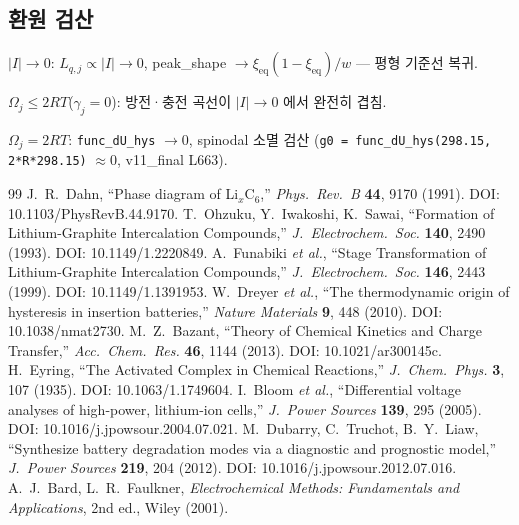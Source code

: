 \documentclass[11pt,a4paper]{article}
\newcommand{\eq}{\mathrm{eq}}
\begin{document}
\subsection{환원 검산}

$|I|\to0$: $L_{q,j}\propto|I|\to0$, peak\_shape $\to\xi_\eq(1-\xi_\eq)/w$ — 평형 기준선 복귀.

$\Omega_j\le2RT$($\gamma_j=0$): 방전·충전 곡선이 $|I|\to0$ 에서 완전히 겹침.

$\Omega_j=2RT$: \texttt{func\_dU\_hys} $\to0$, spinodal 소멸 검산
(\texttt{g0 = func\_dU\_hys(298.15, 2*R*298.15)} $\approx0$, v11\_final L663).

\begin{thebibliography}{99}
 J.\ R.\ Dahn, ``Phase diagram of Li$_x$C$_6$,''
  \emph{Phys.\ Rev.\ B} \textbf{44}, 9170 (1991). DOI: 10.1103/PhysRevB.44.9170.
 T.\ Ohzuku, Y.\ Iwakoshi, K.\ Sawai,
  ``Formation of Lithium-Graphite Intercalation Compounds,''
  \emph{J.\ Electrochem.\ Soc.} \textbf{140}, 2490 (1993). DOI: 10.1149/1.2220849.
 A.\ Funabiki \textit{et al.},
  ``Stage Transformation of Lithium-Graphite Intercalation Compounds,''
  \emph{J.\ Electrochem.\ Soc.} \textbf{146}, 2443 (1999). DOI: 10.1149/1.1391953.
 W.\ Dreyer \textit{et al.},
  ``The thermodynamic origin of hysteresis in insertion batteries,''
  \emph{Nature Materials} \textbf{9}, 448 (2010). DOI: 10.1038/nmat2730.
 M.\ Z.\ Bazant,
  ``Theory of Chemical Kinetics and Charge Transfer,''
  \emph{Acc.\ Chem.\ Res.} \textbf{46}, 1144 (2013). DOI: 10.1021/ar300145c.
 H.\ Eyring,
  ``The Activated Complex in Chemical Reactions,''
  \emph{J.\ Chem.\ Phys.} \textbf{3}, 107 (1935). DOI: 10.1063/1.1749604.
 I.\ Bloom \textit{et al.},
  ``Differential voltage analyses of high-power, lithium-ion cells,''
  \emph{J.\ Power Sources} \textbf{139}, 295 (2005). DOI: 10.1016/j.jpowsour.2004.07.021.
 M.\ Dubarry, C.\ Truchot, B.\ Y.\ Liaw,
  ``Synthesize battery degradation modes via a diagnostic and prognostic model,''
  \emph{J.\ Power Sources} \textbf{219}, 204 (2012). DOI: 10.1016/j.jpowsour.2012.07.016.
 A.\ J.\ Bard, L.\ R.\ Faulkner,
  \emph{Electrochemical Methods: Fundamentals and Applications}, 2nd ed., Wiley (2001).
\end{thebibliography}
\end{document}
